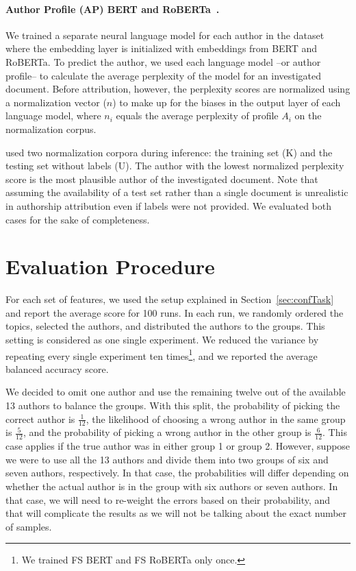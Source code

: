 \documentclass[11pt]{article}
\begin{document}
\paragraph{Author Profile (AP) BERT and RoBERTa~\citep{Barlas2020,Barlas2021}.} 
We trained a separate neural language model for each author in the dataset where the embedding layer is initialized with embeddings from BERT and RoBERTa. To predict the author, we used each language model --or author profile-- to calculate the average perplexity of the model for an investigated document. Before attribution, however, the perplexity scores are normalized using a normalization vector ($n$) to make up for the biases in the output layer of each language model, where $n_i$ equals the average perplexity of profile $A_i$ on the normalization corpus.

\citet{Barlas2020,Barlas2021} used two normalization corpora during inference: the training set (K) and the testing set without labels (U). The author with the lowest normalized perplexity score is the most plausible author of the investigated document. Note that assuming the availability of a test set rather than a single document is unrealistic in authorship attribution even if labels were not provided. We evaluated both cases for the sake of completeness.  

\section{\label{subsec:eval}Evaluation Procedure}
For each set of features, we used the setup explained in Section~\ref{sec:confTask} and report the average score for 100 runs. In each run, we randomly ordered the topics, selected the authors, and distributed the authors to the groups. This setting is considered as one single experiment. We reduced the variance by repeating every single experiment ten times\footnote{We trained FS BERT and FS RoBERTa only once.}, and we reported the average balanced accuracy score.

We decided to omit one author and use the remaining twelve out of the available 13 authors to balance the groups. With this split, the probability of picking the correct author is $\frac{1}{12}$, the likelihood of choosing a wrong author in the same group is $\frac{5}{12}$, and the probability of picking a wrong author in the other group is $\frac{6}{12}$. This case applies if the true author was in either group 1 or group 2. However, suppose we were to use all the 13 authors and divide them into two groups of six and seven authors, respectively. In that case, the probabilities will differ depending on whether the actual author is in the group with six authors or seven authors. In that case, we will need to re-weight the errors based on their probability, and that will complicate the results as we will not be talking about the exact number of samples.  
\end{document}
